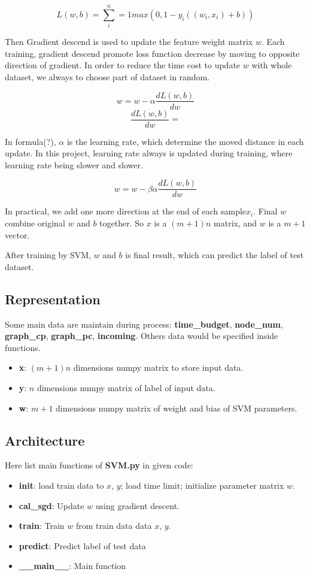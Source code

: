 \documentclass[conference,compsoc]{IEEEtran}
\begin{document}
$$ L(w,b)=\sum^n_i=1 max(0, 1-y_i((w_i, x_i)+b)) $$

Then Gradient descend is used to update the feature weight matrix $w$. Each
training, gradient descend promote loss function decrease by moving to
opposite direction of gradient. In order to reduce the time cost to update
$w$ with whole dataset, we always to choose part of dataset in random.

$$ w = w -\alpha\frac{dL(w,b)}{dw}$$
$$ \frac{dL(w,b)}{dw} = $$

In formula(?), $\alpha$ is the learning rate,
which determine the moved distance in each update. In this project, learning
rate always is updated during training, where learning rate being slower and
slower.

$$w = w -\beta \alpha \frac{dL(w,b)}{dw}$$

In practical, we add one more direction at the end of each sample$x_i$.
Final $w$ combine original $w$ and $b$ together. So $x$ is a $(m+1)n$ matrix,
and $w$ is a $m+1$ vector.

After training by SVM, $w$ and $b$ is final result, which can predict the label
of test dataset.

\subsection{Representation}
Some main data are maintain during process: \textbf{time\_budget},
\textbf{node\_num}, \textbf{graph\_cp}, \textbf{graph\_pc}, \textbf{incoming}.
Others data would be specified inside functions.

\begin{itemize}
	\item \textbf{x}: $(m+1)n$ dimensions numpy matrix to store input data.
  \item \textbf{y}: $n$ dimensions numpy matrix of label of input data.
  \item \textbf{w}: $m+1$ dimensions numpy matrix of weight and bias of SVM
	  parameters.
\end{itemize}


\subsection{Architecture}
Here list main functions of \textbf{SVM.py} in given code:
\begin{itemize}
    \item \textbf{init}: load train data to $x$, $y$; load time limit; initialize
	    parameter matrix $w$.
    \item \textbf{cal\_sgd}: Update $w$ using gradient descent.
    \item \textbf{train}: Train $w$ from train data data $x$, $y$.
    \item \textbf{predict}: Predict label of test data
    \item \textbf{\_\_main\_\_}: Main function
\end{itemize}
\end{document}
